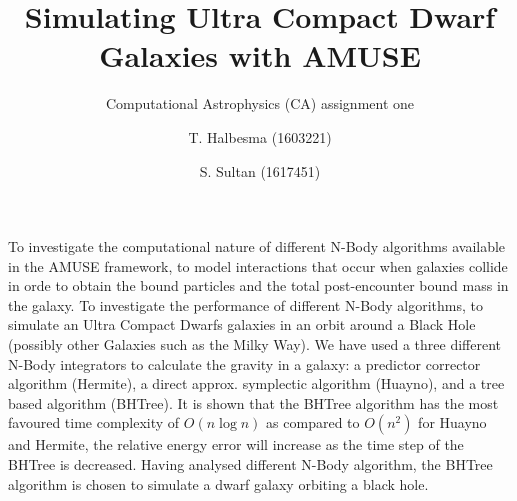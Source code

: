 \documentclass{aa}
\begin{document}
 


   \title{Simulating Ultra Compact Dwarf Galaxies with AMUSE}

   \subtitle{Computational Astrophysics (CA) assignment one}

   \author{T. Halbesma (1603221)
          \and
          S. Sultan (1617451)
          }



 
  \abstract
   {To investigate the computational nature of different N-Body algorithms
   available in the AMUSE framework, to model interactions that occur 
   when galaxies collide in orde to obtain the bound particles and the total
   post-encounter bound mass in the galaxy.}
   {To investigate the performance of different 
   N-Body algorithms, to simulate an Ultra Compact Dwarfs galaxies in an orbit around
   a Black Hole (possibly other Galaxies such as the Milky Way).}
   {We have used a three different N-Body integrators to calculate the gravity in a galaxy:
   a predictor corrector algorithm (Hermite), a direct approx. symplectic algorithm (Huayno),
   and a tree based algorithm (BHTree).}
   {It is shown that the BHTree algorithm has the most favoured time complexity
   of $O(n \log n)$ as compared to $O(n^2)$ for Huayno and Hermite, the
   relative energy error will increase as the time step of the BHTree is decreased.
   Having analysed different N-Body algorithm, the BHTree algorithm 
   is chosen to simulate a dwarf galaxy orbiting a black hole.}
   {}


   \maketitle
%
\end{document}
